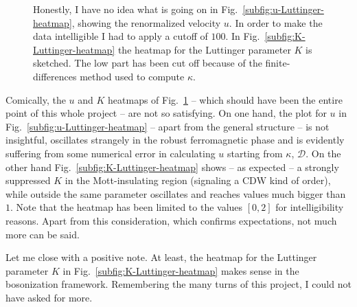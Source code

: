 \begin{figure}
	\centering	
	\caption{Honestly, I have no idea what is going on in Fig.~\ref{subfig:u-Luttinger-heatmap}, showing the renormalized velocity $u$. In order to make the data intelligible I had to apply a cutoff of $100$. In Fig.~\ref{subfig:K-Luttinger-heatmap} the heatmap for the Luttinger parameter $K$ is sketched. The low part has been cut off because of the finite-differences method used to compute $\kappa$.}
	\label{fig:Luttinger-heatmaps}
\end{figure}

Comically, the $u$ and $K$ heatmaps of Fig.~\ref{fig:Luttinger-heatmaps} -- which should have been the entire point of this whole project -- are not so satisfying. On one hand, the plot for $u$ in Fig.~\ref{subfig:u-Luttinger-heatmap} -- apart from the general structure -- is not insightful, oscillates strangely in the robust ferromagnetic phase and is evidently suffering from some numerical error in calculating $u$ starting from $\kappa$, $\mathcal{D}$. On the other hand Fig.~\ref{subfig:K-Luttinger-heatmap} shows -- as expected -- a strongly suppressed $K$ in the Mott-insulating region (signaling a $\mathrm{CDW}$ kind of order), while outside the same parameter oscillates and reaches values much bigger than $1$. Note that the heatmap has been limited to the values $[0,2]$ for intelligibility reasons. Apart from this consideration, which confirms expectations, not much more can be said.

Let me close with a positive note. At least, the heatmap for the Luttinger parameter $K$ in Fig.~\ref{subfig:K-Luttinger-heatmap} makes sense in the bosonization framework. Remembering the many turns of this project, I could not have asked for more.
